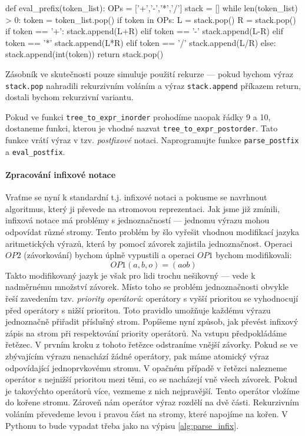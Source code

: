 \begin{python}
def eval_prefix(token_list):
    OPs = ['+','-','*','/']
    stack = []
    while len(token_list) > 0:
        token = token_list.pop()
        if token in OPs:
          L = stack.pop()
          R = stack.pop()
          if token == '+':
            stack.append(L+R)
          elif token == '-'
            stack.append(L-R)
          elif token == '*'
            stack.append(L*R)
          elif token == '/'
            stack.append(L/R)
        else:
          stack.append(int(token))
    return stack.pop()
\end{python}

Zásobník ve skutečnosti pouze simuluje použití rekurze --- pokud bychom
výraz {\tt stack.pop} nahradili rekurzivním voláním a výraz {\tt stack.append}
příkazem return, dostali bychom rekurzivní variantu.

\begin{cviceni} Pokud ve funkci {\tt tree\_to\_expr\_inorder} prohodíme naopak
řádky 9 a 10, dostaneme funkci, kterou je vhodné nazvat
{\tt tree\_to\_expr\_postorder}. Tato funkce vrátí výraz v tzv. \emph{postfixové}
notaci. Naprogramujte funkce {\tt parse\_postfix} a {\tt eval\_postfix}.
\end{cviceni}

\paragraph{Zpracování infixové notace}
Vraťme se nyní k standardní t.j. infixové notaci a pokusme se navrhnout
algoritmus, který ji převede na stromovou reprezentaci. Jak jsme již zmínili,
infixová notace má problémy s jednoznačností --- jednomu výrazu mohou odpovídat
různé stromy. Tento problém by šlo vyřešit vhodnou modifikací jazyka aritmetických
výrazů, která by pomocí závorek zajistila jednoznačnost. Operaci \(OP2\) (závorkování)
bychom úplně vypustili a operaci \(OP1\) bychom modifikovali:
\[
 OP1(a,b,o) = (aob)
\]
Takto modifikovaný jazyk je však pro lidi trochu nešikovný --- vede k nadměrnému
množství závorek. Místo toho se problém jednoznačnosti obvykle řeší zavedením
tzv. \emph{priority operátorů}: operátory s vyšší prioritou se vyhodnocují před
operátory s nižší prioritou. Toto pravidlo umožňuje každému výrazu jednoznačně
přiřadit příslušný strom. Popíšeme nyní způsob, jak převést infixový zápis
na strom při respektování priority operátorů. Na vstupu předpokládáme řetězec.
V prvním kroku z tohoto řetězce odstraníme vnější závorky. Pokud se ve zbývajícím
výrazu nenachází žádné operátory, pak máme atomický výraz odpovídající jednoprvkovému
stromu. V opačném případě v řetězci nalezneme operátor s nejnižší prioritou mezi
těmi, co se nacházejí vně všech závorek. Pokud je takovýchto operátorů více,
vezmeme z nich nejpravější. Tento operátor vložíme do kořene stromu. Zároveň
nám operátor výraz rozdělí na dvě části. Rekurzivním voláním převedeme levou i
pravou část na stromy, které napojíme na kořen. V Pythonu to bude vypadat
třeba jako na výpisu \ref{alg:parse_infix}.

